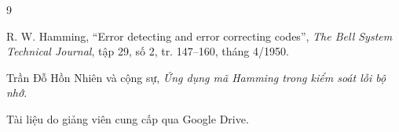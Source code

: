 \cleardoublepage
{}
{}
\begin{thebibliography}{9}
\setlength{\itemsep}{2pt}

R. W. Hamming,
``Error detecting and error correcting codes'',
\emph{The Bell System Technical Journal}, tập 29, số 2, tr. 147--160,
tháng 4/1950.

Trần Đỗ Hồn Nhiên và cộng sự,
\emph{Ứng dụng mã Hamming trong kiểm soát lỗi bộ nhớ}.

Tài liệu do giảng viên cung cấp qua Google Drive.

\end{thebibliography}
